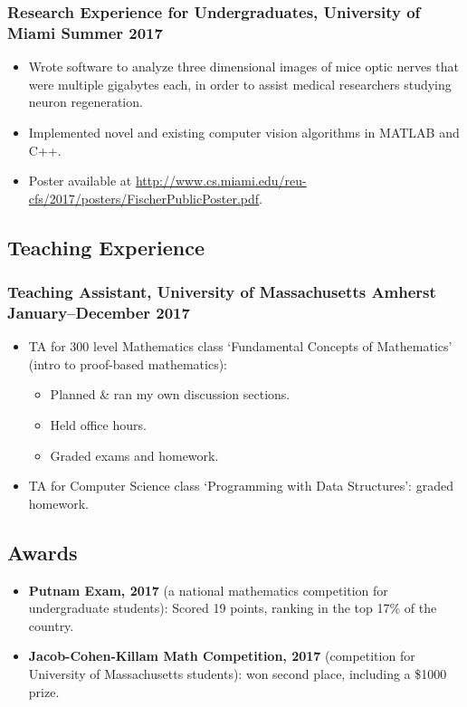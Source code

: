 \documentclass{article}
\begin{document}
		\subsubsection*{Research Experience for Undergraduates, University of Miami \hfill \normalfont \normalsize Summer 2017}
			\begin{itemize}[noitemsep,leftmargin=40pt]
				\item Wrote software to analyze three dimensional images of mice optic nerves that were multiple gigabytes each, in order to assist medical researchers studying neuron regeneration.
				\item Implemented novel and existing computer vision algorithms in MATLAB and C++.
				\item Poster available at \href{http://www.cs.miami.edu/reu-cfs/2017/posters/FischerPublicPoster.pdf}{http://www.cs.miami.edu/reu-cfs/2017/posters/FischerPublicPoster.pdf}.
			\end{itemize}
	
	\subsection*{Teaching Experience}
		\subsubsection*{Teaching Assistant, University of Massachusetts Amherst \hfill \normalfont \normalsize January--December 2017}
		\begin{itemize}[noitemsep,leftmargin=40pt]
			\item TA for 300 level Mathematics class `Fundamental Concepts of Mathematics' (intro to proof-based mathematics):
			\begin{itemize}
				\item Planned \& ran my own discussion sections.
				\item Held office hours.
				\item Graded exams and homework.
			\end{itemize}
			\item TA for Computer Science class `Programming with Data Structures': graded homework.
		\end{itemize}
	
	\subsection*{Awards}
		\begin{itemize}[noitemsep,leftmargin=40pt]
			\item \textbf{Putnam Exam, 2017} (a national mathematics competition for undergraduate students): Scored 19 points, ranking in the top 17\% of the country.
			\item \textbf{Jacob-Cohen-Killam Math Competition, 2017} (competition for University of Massachusetts students): won second place, including a \$1000 prize.
		\end{itemize}
\end{document}
